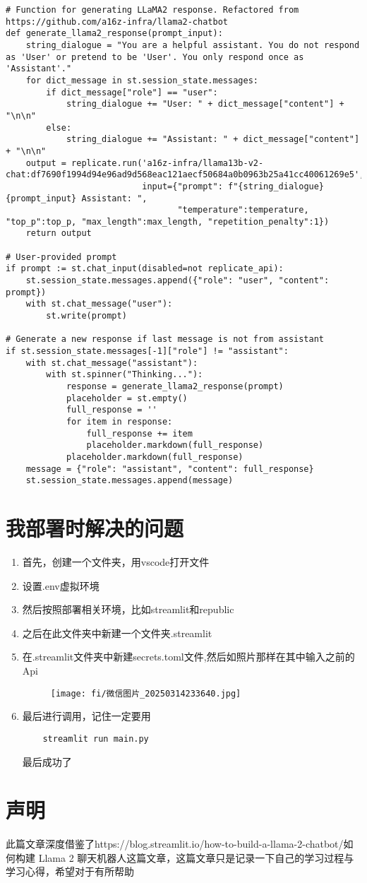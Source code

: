 \documentclass{article}
\begin{document}
\begin{lstlisting}
# Function for generating LLaMA2 response. Refactored from https://github.com/a16z-infra/llama2-chatbot
def generate_llama2_response(prompt_input):
    string_dialogue = "You are a helpful assistant. You do not respond as 'User' or pretend to be 'User'. You only respond once as 'Assistant'."
    for dict_message in st.session_state.messages:
        if dict_message["role"] == "user":
            string_dialogue += "User: " + dict_message["content"] + "\n\n"
        else:
            string_dialogue += "Assistant: " + dict_message["content"] + "\n\n"
    output = replicate.run('a16z-infra/llama13b-v2-chat:df7690f1994d94e96ad9d568eac121aecf50684a0b0963b25a41cc40061269e5', 
                           input={"prompt": f"{string_dialogue} {prompt_input} Assistant: ",
                                  "temperature":temperature, "top_p":top_p, "max_length":max_length, "repetition_penalty":1})
    return output

# User-provided prompt
if prompt := st.chat_input(disabled=not replicate_api):
    st.session_state.messages.append({"role": "user", "content": prompt})
    with st.chat_message("user"):
        st.write(prompt)

# Generate a new response if last message is not from assistant
if st.session_state.messages[-1]["role"] != "assistant":
    with st.chat_message("assistant"):
        with st.spinner("Thinking..."):
            response = generate_llama2_response(prompt)
            placeholder = st.empty()
            full_response = ''
            for item in response:
                full_response += item
                placeholder.markdown(full_response)
            placeholder.markdown(full_response)
    message = {"role": "assistant", "content": full_response}
    st.session_state.messages.append(message)
\end{lstlisting} 
\section{我部署时解决的问题}
\begin{enumerate}[(1)]%
    \item 首先，创建一个文件夹，用vscode打开文件
    \item 设置.env虚拟环境
    \item 然后按照部署相关环境，比如streamlit和republic
    \item 之后在此文件夹中新建一个文件夹.streamlit
    \item 在.streamlit文件夹中新建secrets.toml文件,然后如照片那样在其中输入之前的Api
    \begin{figure}[h]
        \centering
        \texttt{[image: fi/微信图片\_20250314233640.jpg]}
    \end{figure}
    \item 最后进行调用，记住一定要用
    \begin{lstlisting}
    streamlit run main.py
    \end{lstlisting} 
    最后成功了
    \end{enumerate}
\section{声明}
此篇文章深度借鉴了{https://blog.streamlit.io/how-to-build-a-llama-2-chatbot/}{如何构建 Llama 2 聊天机器人}这篇文章，这篇文章只是记录一下自己的学习过程与学习心得，希望对于有所帮助
\end{document}
